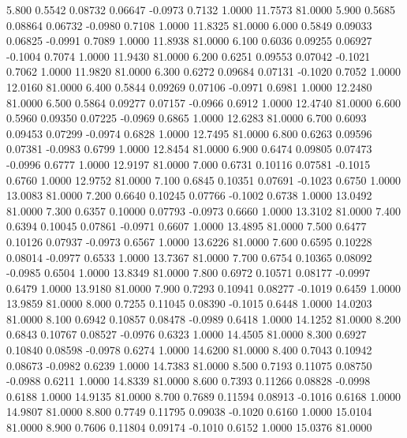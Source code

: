    5.800   0.5542   0.08732   0.06647  -0.0973   0.7132   1.0000  11.7573  81.0000
   5.900   0.5685   0.08864   0.06732  -0.0980   0.7108   1.0000  11.8325  81.0000
   6.000   0.5849   0.09033   0.06825  -0.0991   0.7089   1.0000  11.8938  81.0000
   6.100   0.6036   0.09255   0.06927  -0.1004   0.7074   1.0000  11.9430  81.0000
   6.200   0.6251   0.09553   0.07042  -0.1021   0.7062   1.0000  11.9820  81.0000
   6.300   0.6272   0.09684   0.07131  -0.1020   0.7052   1.0000  12.0160  81.0000
   6.400   0.5844   0.09269   0.07106  -0.0971   0.6981   1.0000  12.2480  81.0000
   6.500   0.5864   0.09277   0.07157  -0.0966   0.6912   1.0000  12.4740  81.0000
   6.600   0.5960   0.09350   0.07225  -0.0969   0.6865   1.0000  12.6283  81.0000
   6.700   0.6093   0.09453   0.07299  -0.0974   0.6828   1.0000  12.7495  81.0000
   6.800   0.6263   0.09596   0.07381  -0.0983   0.6799   1.0000  12.8454  81.0000
   6.900   0.6474   0.09805   0.07473  -0.0996   0.6777   1.0000  12.9197  81.0000
   7.000   0.6731   0.10116   0.07581  -0.1015   0.6760   1.0000  12.9752  81.0000
   7.100   0.6845   0.10351   0.07691  -0.1023   0.6750   1.0000  13.0083  81.0000
   7.200   0.6640   0.10245   0.07766  -0.1002   0.6738   1.0000  13.0492  81.0000
   7.300   0.6357   0.10000   0.07793  -0.0973   0.6660   1.0000  13.3102  81.0000
   7.400   0.6394   0.10045   0.07861  -0.0971   0.6607   1.0000  13.4895  81.0000
   7.500   0.6477   0.10126   0.07937  -0.0973   0.6567   1.0000  13.6226  81.0000
   7.600   0.6595   0.10228   0.08014  -0.0977   0.6533   1.0000  13.7367  81.0000
   7.700   0.6754   0.10365   0.08092  -0.0985   0.6504   1.0000  13.8349  81.0000
   7.800   0.6972   0.10571   0.08177  -0.0997   0.6479   1.0000  13.9180  81.0000
   7.900   0.7293   0.10941   0.08277  -0.1019   0.6459   1.0000  13.9859  81.0000
   8.000   0.7255   0.11045   0.08390  -0.1015   0.6448   1.0000  14.0203  81.0000
   8.100   0.6942   0.10857   0.08478  -0.0989   0.6418   1.0000  14.1252  81.0000
   8.200   0.6843   0.10767   0.08527  -0.0976   0.6323   1.0000  14.4505  81.0000
   8.300   0.6927   0.10840   0.08598  -0.0978   0.6274   1.0000  14.6200  81.0000
   8.400   0.7043   0.10942   0.08673  -0.0982   0.6239   1.0000  14.7383  81.0000
   8.500   0.7193   0.11075   0.08750  -0.0988   0.6211   1.0000  14.8339  81.0000
   8.600   0.7393   0.11266   0.08828  -0.0998   0.6188   1.0000  14.9135  81.0000
   8.700   0.7689   0.11594   0.08913  -0.1016   0.6168   1.0000  14.9807  81.0000
   8.800   0.7749   0.11795   0.09038  -0.1020   0.6160   1.0000  15.0104  81.0000
   8.900   0.7606   0.11804   0.09174  -0.1010   0.6152   1.0000  15.0376  81.0000
